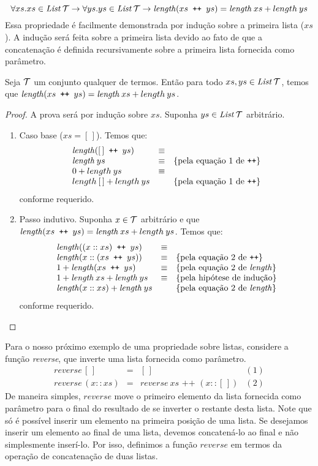 \[
\forall xs. xs \in \textit{List\/}\,\mathcal{T}\to \forall
ys. ys\in\textit{List\/}\,\mathcal{T}\to \textit{length\/} (xs \texttt{ ++ }ys) = \textit{length\/}\: xs +
length\: ys
\]
Essa propriedade é facilmente demonstrada por indução sobre a primeira
lista ($xs$). A indução será feita sobre a primeira lista devido ao
fato de que a concatenação é definida recursivamente sobre a primeira
lista fornecida como parâmetro.
\begin{Theorem}
Seja $\mathcal{T}$ um conjunto qualquer de termos. Então para todo
$xs,ys\in\textit{List\/}\,\mathcal{T}$, temos que $\textit{length\/} (xs \texttt{ ++ }ys) = \textit{length\/}\: xs +
length \:ys$.
\end{Theorem}
\begin{proof}
A prova será por indução sobre $xs$. Suponha $ys\in\textit{List\/}\,\mathcal{T}$
    arbitrário.
\begin{enumerate}
  \item Caso base ($xs = [\,]$). Temos que:
\[
\begin{array}{lcl}
\textit{length\/}([\,]\texttt{ ++ }ys) & \equiv &\\
\textit{length\/}\:ys  & \equiv & \{\text{pela equação 1 de \texttt{++}}\}\\
0 + length\: ys & \equiv & \\
length\:[\,] + length\: ys & & \{\text{pela equação 1 de \texttt{++}}\}
\end{array}
\]
conforme requerido.
\item Passo indutivo. Suponha $x\in\mathcal{T}$ arbitrário e que $\textit{length\/} (xs \texttt{ ++ }ys) = \textit{length\/}\: xs +
length \:ys$. Temos que:
\[
\begin{array}{lcl}
\textit{length\/}((x :: xs) \texttt{ ++ } ys) & \equiv & \\
\textit{length\/}(x :: (xs \texttt{ ++ }ys)) & \equiv & \{\text{pela equação 2
  de \texttt{++}}\} \\
1 + \textit{length\/}(xs \texttt{ ++ }ys) & \equiv &\{\text{pela equação 2 de
  $\textit{length\/}$}\}\\
1 + \textit{length\/}\:xs + \textit{length\/}\: ys & \equiv &\{\text{pela hipótese de
  indução}\}\\
\textit{length\/}(x :: xs) + \textit{length\/}\:ys   & &\{\text{pela equação 2 de $\textit{length\/}$}\}
\end{array}
\]
conforme requerido.
\end{enumerate}
\end{proof}
Para o nosso próximo exemplo de uma propriedade sobre listas,
considere a função \textit{reverse}, que inverte uma lista fornecida
como parâmetro.
\[
\begin{array}{lclc}
reverse\,[\,] & = & [\,] & (1)\\
reverse\,(x :: xs) & = & reverse\: xs \texttt{ ++ } (x :: [\,]) & (2)
\end{array}
\]
De maneira simples, $reverse$ move o primeiro elemento da lista
fornecida como parâmetro para o final do resultado de se inverter o
restante desta lista. Note que só é possível inserir um elemento na
primeira posição de uma lista. Se desejamos inserir um elemento ao
final de uma lista, devemos concatená-lo ao final e não simplesmente
inserí-lo. Por isso, definimos a função $reverse$ em termos da
operação de concatenação de duas listas.

